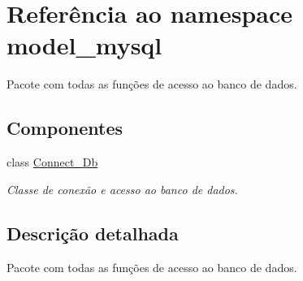\hypertarget{namespacemodel__mysql}{\section{\-Referência ao namespace model\-\_\-mysql}
\label{namespacemodel__mysql}
}


\-Pacote com todas as funções de acesso ao banco de dados.  


\subsection*{\-Componentes}
\begin{DoxyCompactItemize}
\item 
class \hyperlink{classmodel__mysql_1_1_connect___db}{\-Connect\-\_\-\-Db}
\begin{DoxyCompactList}\small\item\em \-Classe de conexão e acesso ao banco de dados. \end{DoxyCompactList}\end{DoxyCompactItemize}


\subsection{\-Descrição detalhada}
\-Pacote com todas as funções de acesso ao banco de dados. 